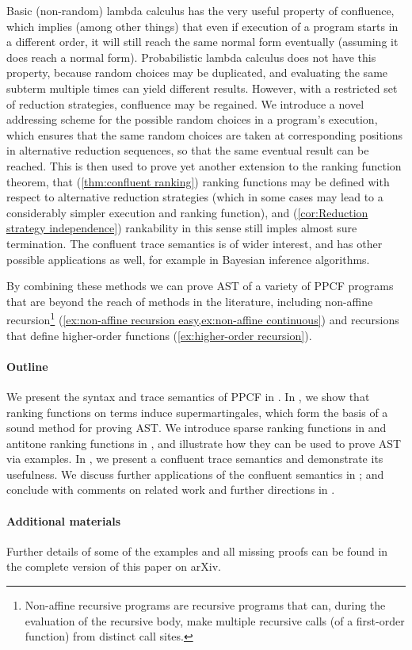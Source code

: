 Basic (non-random) lambda calculus has the very useful property of confluence, which implies (among other things) that even if execution of a program starts in a different order, it will still reach the same normal form eventually (assuming it does reach a normal form). 
Probabilistic lambda calculus does not have this property, because random choices may be duplicated, and evaluating the same subterm multiple times can yield different results. 
However, with a restricted set of reduction strategies, confluence may be regained. 
We introduce a novel addressing scheme for the possible random choices in a program's execution, which ensures that the same random choices are taken at corresponding positions in alternative reduction sequences, so that the same eventual result can be reached. 
This is then used to prove yet another extension to the ranking function theorem, that (\cref{thm:confluent ranking}) ranking functions may be defined with respect to alternative reduction strategies (which in some cases may lead to a considerably simpler execution and ranking function), and (\cref{cor:Reduction strategy independence}) rankability in this sense still imples almost sure termination. 
The confluent trace semantics is of wider interest, and has other possible applications as well, for example in Bayesian inference algorithms.

By combining these methods we can prove AST of a variety of PPCF programs that are beyond the reach of methods in the literature, including non-affine recursion\footnote{\label{fnote:non-affine} Non-affine recursive programs are recursive programs that can, during the evaluation of the recursive body, make multiple recursive calls (of a first-order function) from distinct call sites.} (\cref{ex:non-affine recursion easy,ex:non-affine continuous}) and recursions that define higher-order functions (\cref{ex:higher-order recursion}).

\paragraph*{Outline}

We present the syntax and trace semantics of PPCF in .
In , we show that ranking functions on terms induce supermartingales, which form the basis of a sound method for proving AST.
We introduce sparse ranking functions in  and antitone ranking functions in , and illustrate how they can be used to prove AST via examples. 
In , we present a confluent trace semantics and demonstrate its usefulness.
We discuss further applications of the confluent semantics in ; and conclude with comments on related work and further directions in .

\paragraph*{Additional materials} Further details of some of the examples and all missing proofs can be found in the complete version of this paper on arXiv.\cite{arxiv}
